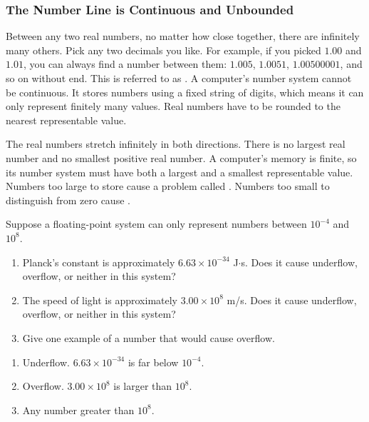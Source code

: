 \subsubsection{The Number Line is Continuous and Unbounded}

Between any two real numbers, no matter how close together, there are infinitely many
others. Pick any two decimals you like. For example, if you picked $1.00$ and $1.01$, you can always find a number between them: $1.005$, $1.0051$, $1.00500001$, and so on without end. This is referred to as . A computer's number system cannot be continuous. It stores numbers using a fixed string
of digits, which means it can only represent finitely many values. Real numbers have to be rounded to the nearest representable value. 

The real numbers stretch infinitely in both directions. There is no largest real number
and no smallest positive real number. A computer's memory is finite, so its number system must have both a largest and a smallest representable value. Numbers too large to store cause a problem called . Numbers too small to distinguish from zero cause . 



\begin{Exercise}[title={Overflow and Underflow}, label={ex:overflow}]
Suppose a floating-point system can only represent numbers between $10^{-4}$ and $10^{8}$.
\begin{enumerate}
    \item Planck's constant is approximately $6.63 \times 10^{-34}$ J$\cdot$s. Does it
    cause underflow, overflow, or neither in this system?
    \item The speed of light is approximately $3.00 \times 10^{8}$ m/s. Does it
    cause underflow, overflow, or neither in this system?
    \item Give one example of a number that would cause overflow.
\end{enumerate}
\end{Exercise}
\begin{Answer}[ref={ex:overflow}]
\begin{enumerate}
    \item Underflow. $6.63 \times 10^{-34}$ is far below $10^{-4}$.
    \item Overflow. $3.00 \times 10^{8}$ is larger than $10^{8}$.
    \item Any number greater than $10^{8}$.
\end{enumerate}
\end{Answer}


